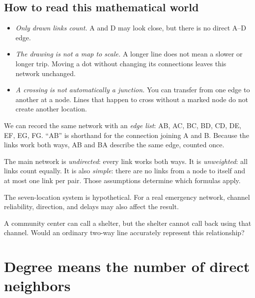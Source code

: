 \documentclass[11pt,letterpaper]{article}
\begin{document}
\subsection*{How to read this mathematical world}

\begin{itemize}
\item \emph{Only drawn links count.} A and D may look close, but there is no direct A--D edge.
\item \emph{The drawing is not a map to scale.} A longer line does not mean a slower or longer trip. Moving a dot without changing its connections leaves this network unchanged.
\item \emph{A crossing is not automatically a junction.} You can transfer from one edge to another at a node. Lines that happen to cross without a marked node do not create another location.

\end{itemize}


We can record the same network with an \emph{edge list}: AB, AC, BC, BD, CD, DE, EF, EG, FG. ``AB'' is shorthand for the connection joining A and B. Because the links work both ways, AB and BA describe the same edge, counted once.



\begin{tcolorbox}[title={Assumptions we will keep using},breakable,colback=warm,colbacktitle=warm,coltitle=gold,colframe=gold!35]

The main network is \emph{undirected}: every link works both ways. It is \emph{unweighted}: all links count equally. It is also \emph{simple}: there are no links from a node to itself and at most one link per pair. Those assumptions determine which formulas apply.


The seven-location system is hypothetical. For a real emergency network, channel reliability, direction, and delays may also affect the result.


\end{tcolorbox}


\begin{tcolorbox}[title={Pause and try 1},breakable]
A community center can call a shelter, but the shelter cannot call back using that channel. Would an ordinary two-way line accurately represent this relationship?
\end{tcolorbox}



\section{Degree means the number of direct neighbors}
\end{document}
